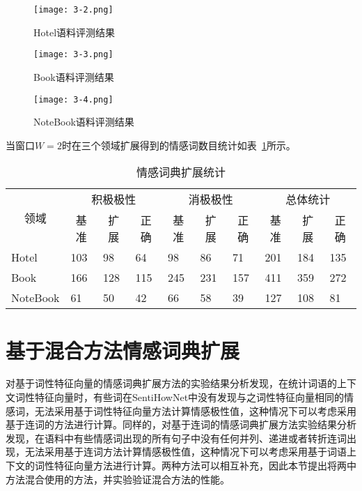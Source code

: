 \begin{figure}[htp]
\centering
\texttt{[image: 3-2.png]}
\caption{Hotel语料评测结果}
\label{fig3-2}
\end{figure}

\begin{figure}[htp]
\centering
\texttt{[image: 3-3.png]}
\caption{Book语料评测结果}
\label{fig3-3}
\end{figure}

\begin{figure}[htp]
\centering
\texttt{[image: 3-4.png]}
\caption{NoteBook语料评测结果}
\label{fig3-4}
\end{figure}

当窗口$W=2$时在三个领域扩展得到的情感词数目统计如表~\ref{tab3-2-3}所示。
\begin{table}[htp]
\centering
\caption{情感词典扩展统计}
\label{tab3-2-3}
\begin{tabular}{|l|l|l|l|l|l|l|l|l|l|}
\hline
\multicolumn{1}{|c|}{\multirow{2}{*}{领域}} & \multicolumn{3}{c|}{积极极性} & \multicolumn{3}{c|}{消极极性} & \multicolumn{3}{c|}{总体统计} \\ \cline{2-10} 
\multicolumn{1}{|c|}{} & \multicolumn{1}{c|}{基准} & \multicolumn{1}{c|}{扩展} & \multicolumn{1}{c|}{正确} & \multicolumn{1}{c|}{基准} & \multicolumn{1}{c|}{扩展} & \multicolumn{1}{c|}{正确} & \multicolumn{1}{c|}{基准} & \multicolumn{1}{c|}{扩展} & \multicolumn{1}{c|}{正确} \\ \hline
Hotel & 103 & 98 & 64 & 98 & 86 & 71 & 201 & 184 & 135 \\ \hline
Book & 166 & 128 & 115 & 245 & 231 & 157 & 411 & 359 & 272 \\ \hline
NoteBook & 61 & 50 & 42 & 66 & 58 & 39 & 127 & 108 & 81 \\ \hline
\end{tabular}
\end{table}

\section{基于混合方法情感词典扩展}
对基于词性特征向量的情感词典扩展方法的实验结果分析发现，在统计词语的上下文词性特征向量时，有些词在SentiHowNet中没有发现与之词性特征向量相同的情感词，无法采用基于词性特征向量方法计算情感极性值，这种情况下可以考虑采用基于连词的方法进行计算。同样的，对基于连词的情感词典扩展方法实验结果分析发现，在语料中有些情感词出现的所有句子中没有任何并列、递进或者转折连词出现，无法采用基于连词方法计算情感极性值，这种情况下可以考虑采用基于词语上下文的词性特征向量方法进行计算。两种方法可以相互补充，因此本节提出将两中方法混合使用的方法，并实验验证混合方法的性能。

